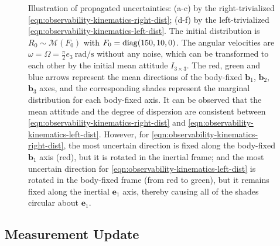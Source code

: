 \begin{figure}
	\caption[Illustration of propagated uncertainties by the right-trivialized \eqref{eqn:observability-kinematics-right-dist} and the left-trivialized \eqref{eqn:observability-kinematics-left-dist}.]{Illustration of propagated uncertainties: (a-c) by the right-trivialized \eqref{eqn:observability-kinematics-right-dist}; (d-f) by the left-trivialized \eqref{eqn:observability-kinematics-left-dist}.
		The initial distribution is $R_0 \sim \mathcal{M}(F_0)$ with $F_0 = \mathrm{diag}(150, 10, 0)$.
		The angular velocities are $\omega = \Omega = \tfrac{\pi}{2}e_3 \SI{}{\radian\per\second}$ without any noise, which can be transformed to each other by the initial mean attitude $I_{3\times 3}$.
		The red, green and blue arrows represent the mean directions of the body-fixed $\bm{b}_1$, $\bm{b}_2$, $\bm{b}_3$ axes, and the corresponding shades represent the marginal distribution for each body-fixed axis.
		It can be observed that the mean attitude and the degree of dispersion are consistent between \eqref{eqn:observability-kinematics-right-dist} and \eqref{eqn:observability-kinematics-left-dist}.
		However, for \eqref{eqn:observability-kinematics-right-dist}, the most uncertain direction is fixed along the body-fixed $\bm{b}_1$ axis (red), but it is rotated in the inertial frame; and the most uncertain direction for \eqref{eqn:observability-kinematics-left-dist} is rotated in the body-fixed frame (from red to green), but it remains fixed along the inertial $\bm{e}_1$ axis, thereby causing all of the shades circular about $\bm{e}_1$.
	}
	\label{fig:observability-kinematics}
\end{figure}

\subsection{Measurement Update} \label{section:observability-measurement}

